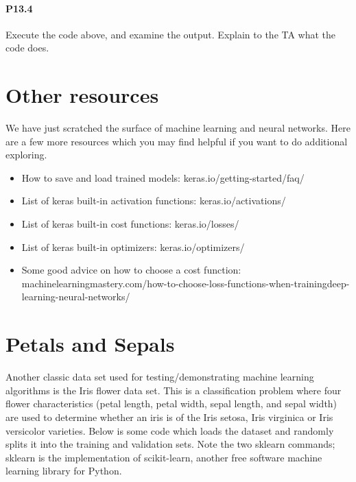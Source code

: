\documentclass{book}
\theoremstyle{plain}
\theoremstyle{definition}
\numberwithin{exm}{chapter}
\theoremstyle{remark}
\theoremstyle{summary}
\theoremstyle{overview}
\begin{document}
\paragraph*{P13.4} Execute the code above, and examine the output. Explain to the TA what
the code does.

\section*{Other resources}

We have just scratched the surface of machine learning and neural networks. Here are a few more resources which you may find helpful if you want to do additional exploring.
\begin{itemize}
\item How to save and load trained models: keras.io/getting-started/faq/
\item List of keras built-in activation functions: keras.io/activations/
\item List of keras built-in cost functions: keras.io/losses/
\item List of keras built-in optimizers: keras.io/optimizers/
\item Some good advice on how to choose a cost function: machinelearningmastery.com/how-to-choose-loss-functions-when-trainingdeep-learning-neural-networks/

\end{itemize}

\section*{Petals and Sepals}
Another classic data set used for testing/demonstrating machine learning algorithms is the Iris flower data set. This is a classification problem where four flower
characteristics (petal length, petal width, sepal length, and sepal width) are used
to determine whether an iris is of the Iris setosa, Iris virginica or Iris versicolor
varieties. Below is some code which loads the dataset and randomly splits it
into the training and validation sets. Note the two sklearn commands; sklearn
is the implementation of scikit-learn, another free software machine learning
library for Python.
\end{document}
